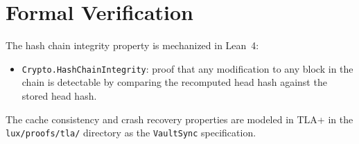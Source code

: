 \section{Formal Verification}

\label{sec:formal}

The hash chain integrity property is mechanized in Lean~4:

\begin{itemize}[nosep]
  \item \texttt{Crypto.HashChainIntegrity}: proof that any modification
        to any block in the chain is detectable by comparing the
        recomputed head hash against the stored head hash.
\end{itemize}

The cache consistency and crash recovery properties are modeled in
TLA+ in the \texttt{lux/proofs/tla/} directory as the
\texttt{VaultSync} specification.

